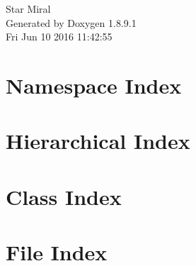 \documentclass[twoside]{book}
\newcommand{\+}{\discretionary{\mbox{\scriptsize$\hookleftarrow$}}{}{}}
\newcommand{\clearemptydoublepage}{%
  \newpage{\pagestyle{empty}\cleardoublepage}%
}
\begin{document}
\hypersetup{pageanchor=false,
             bookmarks=true,
             bookmarksnumbered=true,
             pdfencoding=unicode
            }
\begin{titlepage}
\vspace*{7cm}
\begin{center}%
{\Large Star Miral }\\
\vspace*{1cm}
{\large Generated by Doxygen 1.8.9.1}\\
\vspace*{0.5cm}
{\small Fri Jun 10 2016 11:42:55}\\
\end{center}
\end{titlepage}
\clearemptydoublepage
\tableofcontents
\clearemptydoublepage
{}
\hypersetup{pageanchor=true}

\chapter{Namespace Index}

\chapter{Hierarchical Index}

\chapter{Class Index}

\chapter{File Index}

\end{document}
